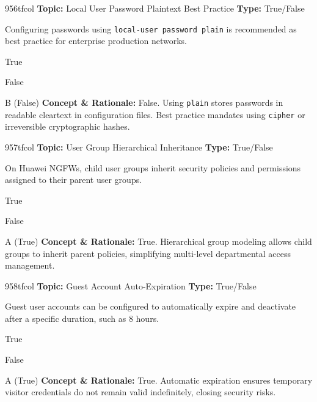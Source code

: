 \begin{qcard}{956}{tfcol}
\textcolor{darkslate!75}{\small\textbf{Topic:} Local User Password Plaintext Best Practice \hfill \textbf{Type:} True/False}\vspace{0.4em}\par
Configuring passwords using \texttt{local-user password plain} is recommended as best practice for enterprise production networks.
\begin{qoptions}
\item True
\item False
\end{qoptions}
\end{qcard}
\nopagebreak
\begin{explainbox}{B (False)}
\textbf{Concept \& Rationale:} False. Using \texttt{plain} stores passwords in readable cleartext in configuration files. Best practice mandates using \texttt{cipher} or irreversible cryptographic hashes.
\end{explainbox}

\begin{qcard}{957}{tfcol}
\textcolor{darkslate!75}{\small\textbf{Topic:} User Group Hierarchical Inheritance \hfill \textbf{Type:} True/False}\vspace{0.4em}\par
On Huawei NGFWs, child user groups inherit security policies and permissions assigned to their parent user groups.
\begin{qoptions}
\item True
\item False
\end{qoptions}
\end{qcard}
\nopagebreak
\begin{explainbox}{A (True)}
\textbf{Concept \& Rationale:} True. Hierarchical group modeling allows child groups to inherit parent policies, simplifying multi-level departmental access management.
\end{explainbox}

\begin{qcard}{958}{tfcol}
\textcolor{darkslate!75}{\small\textbf{Topic:} Guest Account Auto-Expiration \hfill \textbf{Type:} True/False}\vspace{0.4em}\par
Guest user accounts can be configured to automatically expire and deactivate after a specific duration, such as 8 hours.
\begin{qoptions}
\item True
\item False
\end{qoptions}
\end{qcard}
\nopagebreak
\begin{explainbox}{A (True)}
\textbf{Concept \& Rationale:} True. Automatic expiration ensures temporary visitor credentials do not remain valid indefinitely, closing security risks.
\end{explainbox}


